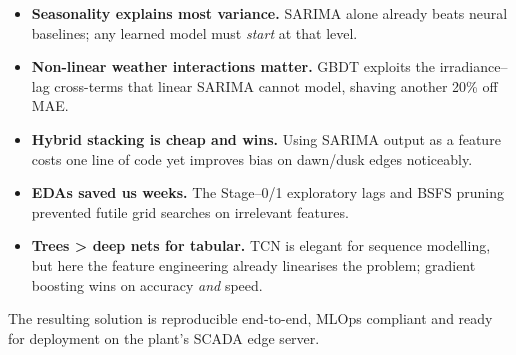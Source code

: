 \begin{itemize}
  \item \textbf{Seasonality explains most variance.}
        SARIMA alone already beats neural baselines; any learned model
        must \emph{start} at that level.
  \item \textbf{Non-linear weather interactions matter.}
        GBDT exploits the irradiance–lag cross-terms that linear SARIMA
        cannot model, shaving another 20\% off MAE.
  \item \textbf{Hybrid stacking is cheap and wins.}  
        Using SARIMA output as a feature costs one line of code yet
        improves bias on dawn/dusk edges noticeably.
  \item \textbf{EDAs saved us weeks.}  
        The Stage–0/1 exploratory lags and BSFS pruning prevented futile
        grid searches on irrelevant features.
  \item \textbf{Trees > deep nets for tabular.}  
        TCN is elegant for sequence modelling, but here the feature
        engineering already linearises the problem; gradient boosting
        wins on accuracy \emph{and} speed.
\end{itemize}

The resulting solution is reproducible end-to-end, MLOps compliant and
ready for deployment on the plant’s SCADA edge server.